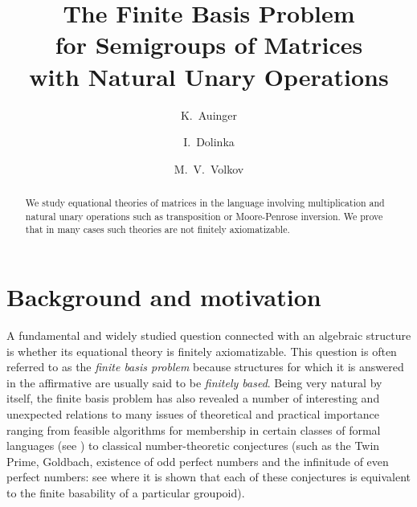 \documentclass[11pt,reqno]{amsart}
\title[Matrix Semigroups with Unary Operations]{The Finite Basis Problem\\ for Semigroups of Matrices\\
with Natural Unary Operations}
\author{K.~Auinger}
\author{I.~Dolinka}
\author {M.~V.~Volkov}
\numberwithin{equation}{section}
\theoremstyle{remark}
\begin{document}
\begin{abstract}
We study equational theories of matrices in the language involving
multiplication and natural unary operations such as transposition
or Moore-Penrose inversion. We prove that in many cases such
theories are not finitely axiomatizable.
\end{abstract}

\maketitle

\section{Background and motivation}
A fundamental and widely studied question connected with an
algebraic structure is whether its equational theory is finitely
axiomatizable. This question is often referred to as the
\emph{finite basis problem} because structures for which it is
answered in the affirmative are usually said to be \emph{finitely
based}. Being very natural by itself, the finite basis problem has
also revealed a number of interesting and unexpected relations to
many issues of theoretical and practical importance ranging from
feasible algorithms for membership in certain classes of formal
languages (see \cite{Alm95}) to classical number-theoretic
conjectures (such as the Twin Prime, Goldbach, existence of odd
perfect numbers and the infinitude of even perfect numbers: see
\cite{Per89} where it is shown that each of these conjectures is
equivalent to the finite basability of a particular groupoid).
\end{document}
